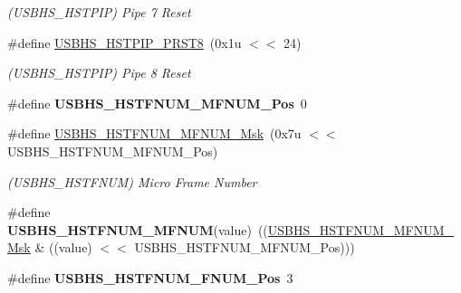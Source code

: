 \begin{DoxyCompactItemize}
\begin{DoxyCompactList}\small\item\em (U\+S\+B\+H\+S\+\_\+\+H\+S\+T\+P\+IP) Pipe 7 Reset \end{DoxyCompactList}\item 
\mbox{\label{group__SAMV71__USBHS_ga7da6e19c73db3010526a8d3a42c4d49e}} 
\#define \mbox{\hyperlink{group__SAMV71__USBHS_ga7da6e19c73db3010526a8d3a42c4d49e}{U\+S\+B\+H\+S\+\_\+\+H\+S\+T\+P\+I\+P\+\_\+\+P\+R\+S\+T8}}~(0x1u $<$$<$ 24)
\begin{DoxyCompactList}\small\item\em (U\+S\+B\+H\+S\+\_\+\+H\+S\+T\+P\+IP) Pipe 8 Reset \end{DoxyCompactList}\item 
\mbox{\label{group__SAMV71__USBHS_ga516a648997039419b7b87f9798b97c60}} 
\#define {\bfseries U\+S\+B\+H\+S\+\_\+\+H\+S\+T\+F\+N\+U\+M\+\_\+\+M\+F\+N\+U\+M\+\_\+\+Pos}~0
\item 
\mbox{\label{group__SAMV71__USBHS_gaa6eb63a90913102975022647c0b2af3d}} 
\#define \mbox{\hyperlink{group__SAMV71__USBHS_gaa6eb63a90913102975022647c0b2af3d}{U\+S\+B\+H\+S\+\_\+\+H\+S\+T\+F\+N\+U\+M\+\_\+\+M\+F\+N\+U\+M\+\_\+\+Msk}}~(0x7u $<$$<$ U\+S\+B\+H\+S\+\_\+\+H\+S\+T\+F\+N\+U\+M\+\_\+\+M\+F\+N\+U\+M\+\_\+\+Pos)
\begin{DoxyCompactList}\small\item\em (U\+S\+B\+H\+S\+\_\+\+H\+S\+T\+F\+N\+UM) Micro Frame Number \end{DoxyCompactList}\item 
\mbox{\label{group__SAMV71__USBHS_ga3704452b0f8c713899f51e0a7dc20342}} 
\#define {\bfseries U\+S\+B\+H\+S\+\_\+\+H\+S\+T\+F\+N\+U\+M\+\_\+\+M\+F\+N\+UM}(value)~((\mbox{\hyperlink{group__SAMV71__USBHS_gaa6eb63a90913102975022647c0b2af3d}{U\+S\+B\+H\+S\+\_\+\+H\+S\+T\+F\+N\+U\+M\+\_\+\+M\+F\+N\+U\+M\+\_\+\+Msk}} \& ((value) $<$$<$ U\+S\+B\+H\+S\+\_\+\+H\+S\+T\+F\+N\+U\+M\+\_\+\+M\+F\+N\+U\+M\+\_\+\+Pos)))
\item 
\mbox{\label{group__SAMV71__USBHS_gaca6d368cfde9f1c4c6efeba049f87619}} 
\#define {\bfseries U\+S\+B\+H\+S\+\_\+\+H\+S\+T\+F\+N\+U\+M\+\_\+\+F\+N\+U\+M\+\_\+\+Pos}~3
\item 
$$
\end{DoxyCompactItemize}
